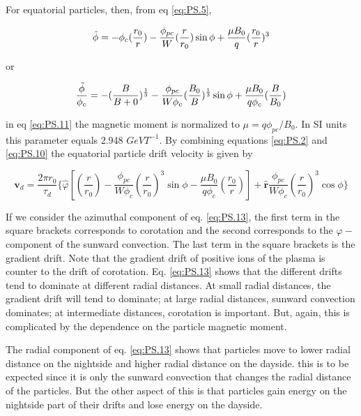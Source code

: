 \documentclass[utf8]{report}
\begin{document}
For equatorial particles, then, from eq \ref{eq:PS.5}, 

\begin{equation}
    \Tilde{\phi} = -\phi_{c} (\frac{r_{0}}{r}) - \frac{\phi_{pc}}{W}(\frac{r}{r_{0}})\sin{\phi}+\frac{\mu B_{0}}{q} (\frac{r_{0}}{r})^{3}
    \label{eq:PS.11}
\end{equation}

or

\begin{equation}
    \frac{\Tilde{\phi}}{\phi_{c}} = -(\frac{B}{B+{0}})^{\frac{1}{3}} - \frac{\phi_{pc}}{W\phi_{c}}(\frac{B_{0}}{B})^{\frac{1}{3}}\sin{\phi} + \frac{\mu B_{0}}{q\phi_{c}}(\frac{B}{B_{0}})
    \label{eq:PS.12}
\end{equation}

in eq \ref{eq:PS.11} the magnetic moment is normalized to $\mu = q \phi_{pc} / B_{0}$. In SI units this parameter equals 2.948 $GeVT^{-1}$. By combining equations \ref{eq:PS.2} and \ref{eq:PS.10} the equatorial particle drift velocity is given by

\begin{equation}
    \textbf{v}_{d} = \frac{2\pi r_{0}}{\tau_{d}} \{ \hat{{\varphi}} [(\frac{r}{r_{0}}) - \frac{\phi_{pc}}{W\phi_{c}}(\frac{r}{r_{0}})^{3}\sin{\phi} - \frac{\mu B_{0}}{q\phi_{c}}(\frac{r_{0}}{r})]+\hat{\boldsymbol{r}}\frac{\phi_{pc}}{W\phi_{c}}(\frac{r}{r_{0}})^{3}\cos{\phi}\}
    \label{eq:PS.13}
\end{equation}

If we consider the azimuthal component of eq. \ref{eq:PS.13}, the first term in the square brackets corresponds to corotation and the second corresponds to the $\varphi-$component of the sunward convection. The last term in the square brackets is the gradient drift. Note that the gradient drift of positive ions of the plasma is counter to the drift of corotation. Eq. \ref{eq:PS.13} shows that the different drifts tend to dominate at different radial distances. At small radial distances, the gradient drift will tend to dominate; at large radial distances, sunward convection dominates; at intermediate distances, corotation is important. But, again, this is complicated by the dependence  on the particle magnetic moment. 

The radial component of eq. \ref{eq:PS.13} shows that particles move to lower radial distance on the nightside and higher radial distance on the dayside. this is to be expected since it is only the sunward convection that changes the radial distance of the particles. But the other aspect of this is that particles gain energy on the nightside part of their drifts and lose energy on the dayside. 
\end{document}
